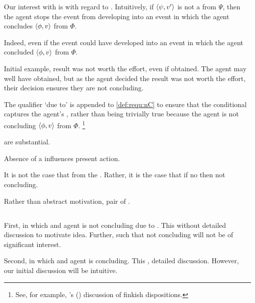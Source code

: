 \begin{note}
  Our interest with  is with regard to .
  Intuitively, if \(\langle \psi, v' \rangle\) is not a \fc{} from \(\Psi\), then the agent stops the event from developing into an event in which the agent concludes \(\langle \phi, v \rangle\) from \(\Phi\).

  Indeed, even if the event could have developed into an event in which the agent concluded \(\langle \phi, v \rangle\) from \(\Phi\).

  Initial example, result was not worth the effort, even if obtained.
  The agent may well have obtained, but as the agent decided the result was not worth the effort, their decision ensures they are not concluding.
\end{note}

\begin{note}
  The qualifier `due to' is appended to \ref{def:requ:nC} to ensure that the conditional captures the agent's \ninf{}, rather than being trivially true because the agent is not concluding \(\langle \phi, v \rangle\) from \(\Phi\).%
  \footnote{
    See, for example, \citeauthor{Lewis:1997wg}'s (\citeyear{Lewis:1997wg}) discussion of finkish dispositions.
  }
\end{note}


\begin{note}
   are substantial.

  Absence of a \fc{} influences present action.

  It is not the case that from the \agpe{}.
  Rather, it is the case that if no \fc{} then not concluding.

  Rather than abstract motivation, pair of .
\end{note}

\subsection{}
\label{sec:illu3}

\begin{note}
  First,  in which \requ{} and agent is not concluding due to \requ{}.
  This  without detailed discussion to motivate idea.
  Further,  such that not concluding will not be of significant interest.

  Second,  in which \requ{} and agent is concluding.
  This , detailed discussion.
  However, our initial discussion will be intuitive.
\end{note}

